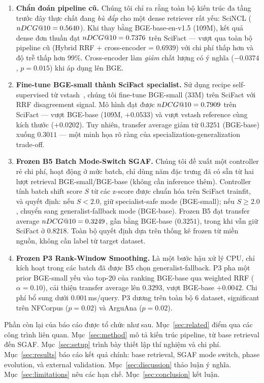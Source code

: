 \begin{enumerate}[leftmargin=2em,itemsep=2pt]
  \item \textbf{Chẩn đoán pipeline cũ.} Chúng tôi chỉ ra rằng toàn bộ kiến trúc đa tầng trước đây thực
  chất đang \emph{bù đắp} cho một dense retriever rất yếu: SciNCL ($nDCG@10 = 0.5640$). Khi thay bằng
  BGE-base-en-v1.5 (109M), kết quả dense đơn thuần đạt $nDCG@10 = 0.7376$ trên SciFact --- vượt qua
  toàn bộ pipeline cũ (Hybrid RRF + cross-encoder = $0.6939$) với chi phí thấp hơn và độ trễ thấp hơn
  99\%. Cross-encoder làm \emph{giảm} chất lượng có ý nghĩa ($-0.0374$, $p=0.015$) khi áp dụng lên BGE.

  \item \textbf{Fine-tune BGE-small thành SciFact specialist.} Sử dụng recipe self-supervised từ
  vstash~\citep{steffens2026vstash}, chúng tôi fine-tune BGE-small (33M) trên SciFact với RRF
  disagreement signal. Mô hình đạt được $nDCG@10 = 0.7909$ trên SciFact --- vượt BGE-base (109M, $+0.0533$)
  và vượt vstash reference cùng kích thước ($+0.0202$). Tuy nhiên, transfer average giảm từ $0.3251$
  (BGE-base) xuống $0.3011$ --- một minh họa rõ ràng của specialization-generalization trade-off.

  \item \textbf{Frozen B5 Batch Mode-Switch SGAF.} Chúng tôi đề xuất một controller rẻ chi phí, hoạt
  động ở mức batch, chỉ dùng năm đặc trưng đã có sẵn từ hai lượt retrieval BGE-small/BGE-base (không
  cần inference thêm). Controller tính batch shift score $S$ từ các z-score được chuẩn hóa trên SciFact
  trainfit, và quyết định: nếu $S < 2.0$, giữ specialist-safe mode (BGE-small); nếu $S \ge 2.0$, chuyển
  sang generalist-fallback mode (BGE-base). Frozen B5 đạt transfer average $nDCG@10 = 0.3249$, gần bằng
  BGE-base ($0.3251$), trong khi vẫn giữ SciFact ở $0.8218$. Toàn bộ quyết định dựa trên thống kê
  frozen từ miền nguồn, không cần label từ target dataset.

  \item \textbf{Frozen P3 Rank-Window Smoothing.} Là một bước hậu xử lý CPU, chỉ kích hoạt trong các
  batch đã được B5 chọn generalist-fallback. P3 pha một prior BGE-small yếu vào top-20 của ranking
  BGE-base qua weighted RRF ($\alpha = 0.10$), cải thiện transfer average lên $0.3293$, vượt BGE-base
  $+0.0042$. Chi phí bổ sung dưới $0.001$\,ms/query. P3 dương trên toàn bộ 6 dataset, significant
  trên NFCorpus ($p=0.02$) và ArguAna ($p=0.02$).
\end{enumerate}

Phần còn lại của báo cáo được tổ chức như sau. Mục~\ref{sec:related} điểm qua các công trình liên quan.
Mục~\ref{sec:method} mô tả kiến trúc pipeline, từ base retrieval đến SGAF. Mục~\ref{sec:setup} trình bày
thiết lập thí nghiệm và chi phí. Mục~\ref{sec:results} báo cáo kết quả chính: base retrieval, SGAF mode
switch, phase evolution, và external validation. Mục~\ref{sec:discussion} thảo luận ý nghĩa. Mục~\ref{sec:limitations}
nêu các hạn chế. Mục~\ref{sec:conclusion} kết luận.
